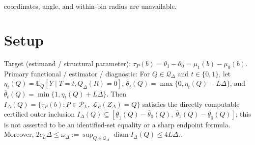 \documentclass{article}
\begin{document}
coordinates, angle, and within-bin radius are unavailable.

\section{Setup}

Target (estimand / structural parameter): \(\tau_P(b)=\theta_1-\theta_0=\mu_1(b)-\mu_0(b)\).
Primary functional / estimator / diagnostic: For \(Q\in\mathcal Q_\Delta\) and \(t\in\{0,1\}\), let \(\eta_t(Q)=\mathbb E_Q[Y\mid T=t,Q_\Delta(R)=0]\), \(\underline{\theta}_t(Q)=\max\{0,\eta_t(Q)-L\Delta\}\), and \(\overline{\theta}_t(Q)=\min\{1,\eta_t(Q)+L\Delta\}\). Then \(I_\Delta(Q)=\{\tau_P(b):P\in\mathcal P_L,\ \mathcal L_P(Z_\Delta)=Q\}\) satisfies the directly computable certified outer inclusion \(I_\Delta(Q)\subseteq[\underline{\theta}_1(Q)-\overline{\theta}_0(Q),\ \overline{\theta}_1(Q)-\underline{\theta}_0(Q)]\); this is not asserted to be an identified-set equality or a sharp endpoint formula. Moreover, \(2c_L\Delta\leq\omega_\Delta:=\sup_{Q\in\mathcal Q_\Delta}\operatorname{diam}I_\Delta(Q)\leq4L\Delta\)..
\end{document}
